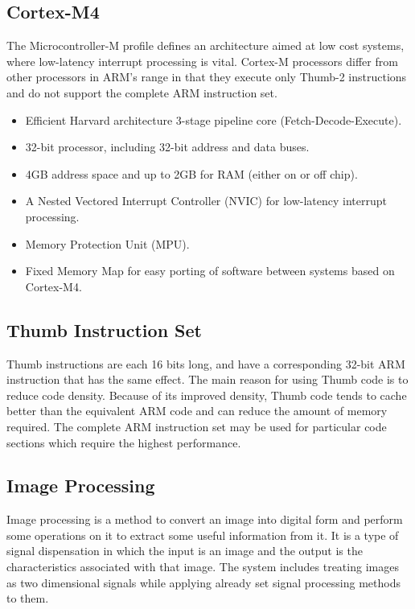\documentclass[a4paper,conference]{IEEEtran}
\begin{document}
	  \subsection{Cortex-M4} \label{subsection:Cortex-M4}

The Microcontroller-M profile defines an architecture aimed at low cost systems,
where low-latency interrupt processing is vital. Cortex-M processors differ from other processors in
ARM’s range in that they execute only Thumb-2 instructions and do not support the complete ARM
instruction set.

\begin{itemize}
    \item Efficient Harvard architecture 3-stage pipeline core (Fetch-Decode-Execute). 
    \item 32-bit processor, including 32-bit address and data buses.
    \item 4GB address space and up to 2GB for RAM (either on or off chip).
    \item A Nested Vectored Interrupt Controller (NVIC) for low-latency interrupt processing.
    \item Memory Protection Unit (MPU).
    \item Fixed Memory Map for easy porting of software between systems based on Cortex-M4.
  \end{itemize}

  \subsection{Thumb Instruction Set} \label{subsection:Thumb}

Thumb instructions are each 16 bits long, and have a corresponding 32-bit ARM instruction that has the same effect. The main reason for using Thumb code is to reduce code density. Because of its
improved density, Thumb code tends to cache better than the equivalent ARM code and can
reduce the amount of memory required. The complete ARM instruction set may be used for particular code sections which require the highest performance.

\subsection{Image Processing} \label{subsection:image_processing}
	
Image processing is a method to convert an image into digital form and perform some operations on it to extract some useful information from it. It is a type of signal dispensation in which the input is an image and the output is the characteristics associated with that image. The system includes treating images as two dimensional signals while applying already set signal processing methods to them. 
\end{document}

